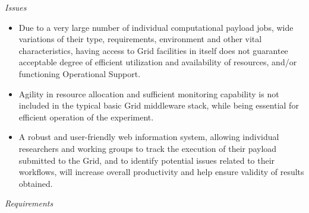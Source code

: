 \noindent
\textit{Issues}
\begin{itemize}
	\item Due to a very large number of individual computational payload jobs, wide variations of their type, requirements, environment and other vital characteristics, having access to Grid facilities in itself does not guarantee acceptable degree of efficient utilization and availability of resources, and/or functioning Operational Support.
	
	\item Agility in resource allocation and sufficient monitoring capability is not included in the typical basic Grid middleware stack, while being essential for efficient operation of the experiment.
	\item A robust and user-friendly web information system, allowing individual researchers and working groups to track the execution of 
	their payload submitted to the Grid, and to identify potential issues related to their workflows, will increase overall productivity and help ensure validity of results obtained.
\end{itemize}
\noindent
\textit{Requirements}

